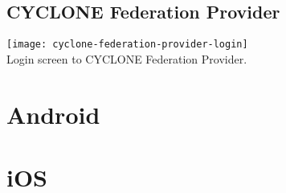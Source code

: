 \subsection{CYCLONE Federation Provider}
\label{federation-provider}

\begin{center}
    \texttt{[image: cyclone-federation-provider-login]}\\
    Login screen to CYCLONE Federation Provider.
\end{center}


\vspace{0.5cm}

\section{Android}


\vspace{0.5cm}

\section{iOS}
